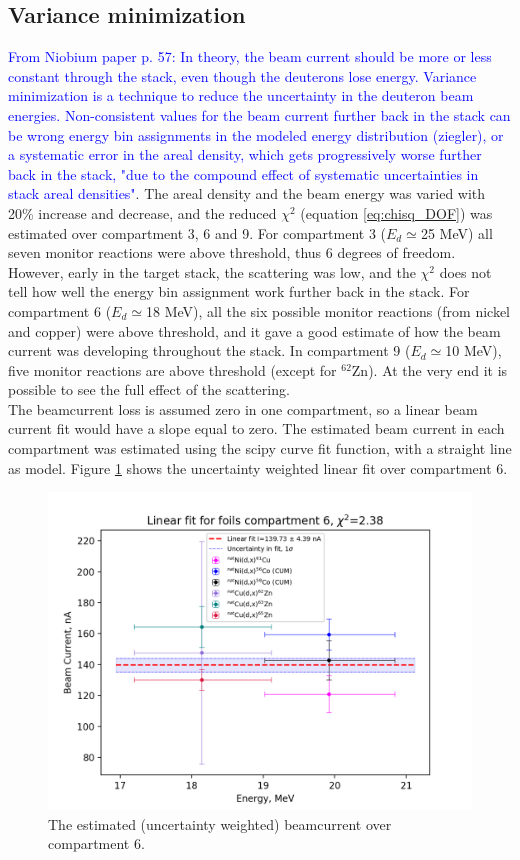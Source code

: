 \documentclass[a4paper,11pt,twoside]{book}
\begin{document}
\subsection{Variance minimization}
\textcolor{blue}{From Niobium paper p. 57: In theory, the beam current should be more or less constant through the stack, even though the deuterons lose energy. Variance minimization is a technique to reduce the uncertainty in the deuteron beam energies. Non-consistent values  for the beam current further back in the stack can be wrong energy bin assignments in the modeled energy distribution (ziegler), or a systematic error in the areal density, which gets progressively worse further back in the stack, "due to the compound effect of systematic uncertainties in stack areal densities"}. The areal density and the beam energy was varied with 20\% increase and decrease, and the reduced $\chi^2$ (equation \ref{eq:chisq_DOF}) was estimated over compartment 3, 6 and 9. For compartment 3 ($E_d\simeq$25 MeV) all seven monitor reactions were above threshold, thus 6 degrees of freedom. However, early in the target stack, the scattering was low, and the $\chi^2$ does not tell how well the energy bin assignment work further back in the stack. For compartment 6 ($E_d\simeq$18 MeV), all the six possible monitor reactions (from nickel and copper) were above threshold, and it gave a good estimate of how the beam current was developing throughout the stack. In compartment 9 ($E_d\simeq$10 MeV), five monitor reactions are above threshold (except for $^{62}$Zn). At the very end it is possible to see the full effect of the scattering. \\

\noindent 
The beamcurrent loss is assumed zero in one compartment, so a linear beam current fit would have a slope equal to zero. The estimated beam current in each compartment was estimated using the scipy curve fit function, with a straight line as model. Figure \ref{fig:BC_comp6} shows the uncertainty weighted linear fit over compartment 6. 

\begin{figure}
    \centering
    \includegraphics{Analysis/Compartment_6.png}
    \caption{The estimated (uncertainty weighted) beamcurrent over compartment 6. }
    \label{fig:BC_comp6}
\end{figure}
\end{document}

